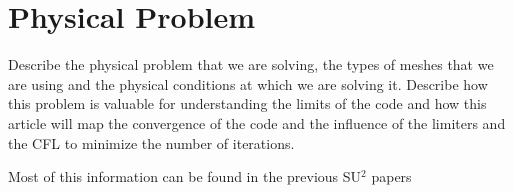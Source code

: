 
\section{Physical Problem}

Describe the physical problem that we are solving, the types of meshes that we are using and the physical conditions at which we are solving it. 
Describe how this problem is valuable for understanding the limits of the code and how this article will map the convergence of the code and the influence of the limiters and the CFL to minimize the number of iterations.






Most of this information can be found in the previous SU$^2$ papers \cite{Palacios:2014,PalaciosEconomon:2014}